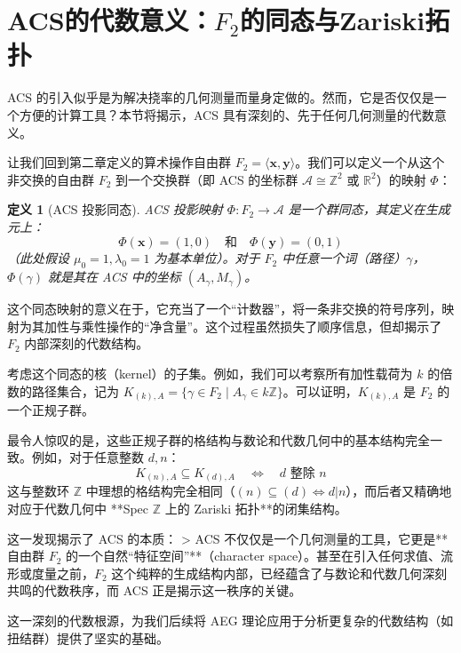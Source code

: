 \documentclass[a4paper,12pt]{book}
\numberwithin{problem}{section}
\newtheorem{definition}{定义}
\numberwithin{definition}{section}
\numberwithin{lemma}{section}
\numberwithin{proposition}{section}
\numberwithin{theorem}{section}
\numberwithin{grammar}{section}
\numberwithin{program}{section}
\numberwithin{convention}{section}
\numberwithin{corollary}{section}
\begin{document}
\section{ACS的代数意义：$F_2$的同态与Zariski拓扑}
\label{sec:acs_algebraic_significance}

ACS 的引入似乎是为解决挠率的几何测量而量身定做的。然而，它是否仅仅是一个方便的计算工具？本节将揭示，ACS 具有深刻的、先于任何几何测量的代数意义。

让我们回到第二章定义的算术操作自由群 $F_2 = \langle \mathbf{x}, \mathbf{y} \rangle$。我们可以定义一个从这个非交换的自由群 $F_2$ 到一个交换群（即 ACS 的坐标群 $\mathcal{A} \cong \mathbb{Z}^2$ 或 $\mathbb{R}^2$）的映射 $\Phi$：
\begin{definition}[ACS 投影同态]
    \label{def:acs_homomorphism}
    ACS 投影映射 $\Phi: F_2 \to \mathcal{A}$ 是一个群同态，其定义在生成元上：
    \[ \Phi(\mathbf{x}) = (1, 0) \quad \text{和} \quad \Phi(\mathbf{y}) = (0, 1) \]
    （此处假设 $\mu_0=1, \lambda_0=1$ 为基本单位）。对于 $F_2$ 中任意一个词（路径）$\gamma$，$\Phi(\gamma)$ 就是其在 ACS 中的坐标 $(A_\gamma, M_\gamma)$。
\end{definition}

这个同态映射的意义在于，它充当了一个“计数器”，将一条非交换的符号序列，映射为其加性与乘性操作的“净含量”。这个过程虽然损失了顺序信息，但却揭示了 $F_2$ 内部深刻的代数结构。

考虑这个同态的核（kernel）的子集。例如，我们可以考察所有加性载荷为 $k$ 的倍数的路径集合，记为 $K_{(k), A} = \{ \gamma \in F_2 \mid A_\gamma \in k\mathbb{Z} \}$。可以证明，$K_{(k), A}$ 是 $F_2$ 的一个正规子群。

最令人惊叹的是，这些正规子群的格结构与数论和代数几何中的基本结构完全一致。例如，对于任意整数 $d, n$：
\[ K_{(n), A} \subseteq K_{(d), A} \quad \iff \quad d \text{ 整除 } n \]
这与整数环 $\mathbb{Z}$ 中理想的格结构完全相同（$(n) \subseteq (d) \iff d|n$），而后者又精确地对应于代数几何中 **Spec $\mathbb{Z}$ 上的 Zariski 拓扑**的闭集结构。

这一发现揭示了 ACS 的本质：
> ACS 不仅仅是一个几何测量的工具，它更是**自由群 $F_2$ 的一个自然“特征空间”**（character space）。甚至在引入任何求值、流形或度量之前，$F_2$ 这个纯粹的生成结构内部，已经蕴含了与数论和代数几何深刻共鸣的代数秩序，而 ACS 正是揭示这一秩序的关键。

这一深刻的代数根源，为我们后续将 AEG 理论应用于分析更复杂的代数结构（如扭结群）提供了坚实的基础。

\end{document}
